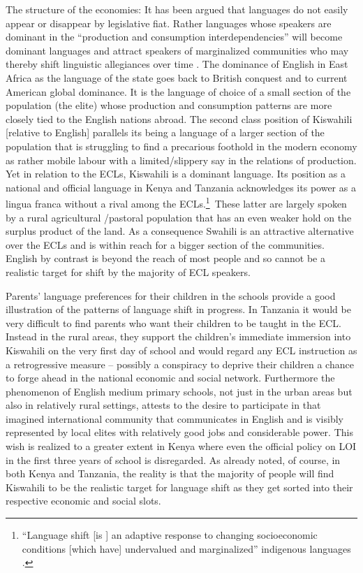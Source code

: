 \documentclass[output=paper,colorlinks,citecolor=brown]{langscibook}
\begin{document}
The structure of the economies: It has been argued that languages do not easily appear or disappear by legislative fiat. Rather languages whose speakers are dominant in the “production and consumption interdependencies” will become dominant languages and attract speakers of marginalized communities who may thereby shift linguistic allegiances over time  \citep[218]{Mufwene2004}. The dominance of English in East Africa as the language of the state goes back to British conquest and to current American global dominance. It is the language of choice of a small section of the population (the elite) whose production and consumption patterns are more closely tied to the English nations abroad. The second class position of Kiswahili [relative to English] parallels its being a language of a larger section of the population that is struggling to find a precarious foothold in the modern economy as rather mobile labour with a limited\slash slippery say in the relations of production. Yet in relation to the ECLs, Kiswahili is a dominant language. Its position as a national and official language in Kenya and Tanzania acknowledges its power as a lingua franca without a rival among the ECLs.\footnote{“Language shift [is ] an adaptive response to changing socioeconomic conditions [which have] undervalued and marginalized” indigenous languages \citep[207]{Mufwene2004}.
}~These latter are largely spoken by a rural agricultural /pastoral population that has an even weaker hold on the surplus product of the land. As a consequence Swahili is an attractive alternative over the ECLs and is within reach for a bigger section of the communities. English by contrast is beyond the reach of most people and so cannot be a realistic target for shift by the majority of ECL speakers.

Parents’ language preferences for their children in the schools provide a good illustration of the patterns of language shift in progress. In Tanzania it would be very difficult to find parents who want their children to be taught in the ECL. Instead in the rural areas, they support the children’s immediate immersion into Kiswahili on the very first day of school and would regard any ECL instruction as a retrogressive measure – possibly a conspiracy to deprive their children a chance to forge ahead in the national economic and social network.  Furthermore the phenomenon of English medium primary schools, not just in the urban areas but also in relatively rural settings, attests to the desire to participate in that imagined international community that communicates in English and is visibly represented by local elites with relatively good jobs and considerable power. This wish is realized to a greater extent in Kenya where even the official policy on LOI in the first three years of school is disregarded. As already noted, of course, in both Kenya and Tanzania, the reality is that the majority of people will find Kiswahili to be the realistic target for language shift as they get sorted into their respective economic and social slots.
\end{document}
